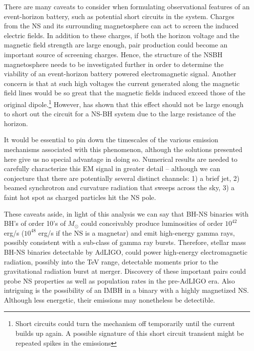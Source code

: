 There are many caveats to consider when formulating
observational features of an event-horizon battery, such as potential short
circuits in the system.
Charges from the NS and its surrounding magnetosphere can act to 
screen the induced electric fields. In addition to these charges, 
if both the horizon voltage and the magnetic field strength are large 
enough, pair production could become an important source of screening charges.
Hence, the structure of the NSBH magnetosphere needs to be investigated 
further in order to determine the viability of an event-horizon battery powered electromagnetic signal.
Another concern is that at such high voltages 
the current generated along the magnetic field lines would 
be so great that the magnetic fields induced exceed those of 
the original dipole.\footnote{Short circuits could turn the mechanism off
temporarily until the current builds up again. A possible signature of
this short circuit transient might be repeated spikes in the emissions }
However, \citep{DLai:2012} has shown 
that this effect should not be large enough to short out the circuit for
a NS-BH system due to the large resistance of the horizon.


It would be essential to pin down the
timescales of the various emission mechanisms associated with this phenomenon, although the
solutions presented here give us no special advantage in doing so. 
Numerical results are needed to carefully characterize this EM signal in greater
detail --  although we can conjecture that 
there are potentially several 
distinct channels: 1) a brief jet, 2) beamed synchrotron and curvature radiation that sweeps
across the sky, 3) a faint hot
spot as charged particles hit the NS pole. 

These caveats aside, in light of this analysis we can say that BH-NS binaries with
BH's of order 10's of $M_{\odot}$ could conceivably produce luminosities of order 
$10^{42}$ erg/s ($10^{48}$ erg/s if the NS is a magnetar) and emit
high-energy gamma rays, possibly consistent with a sub-class of gamma ray bursts.
Therefore, stellar mass BH-NS binaries detectable
by AdLIGO, could power high-energy electromagnetic radiation, possibly into the TeV range, detectable moments prior to the gravitational radiation burst at merger.
Discovery of these important pairs could
probe NS properties as well as population rates in the pre-AdLIGO era.
Also intriguing is the possibility of an
IMBH in a binary with a highly magnetized NS. Although less energetic, their emissions
may nonetheless be detectible.


